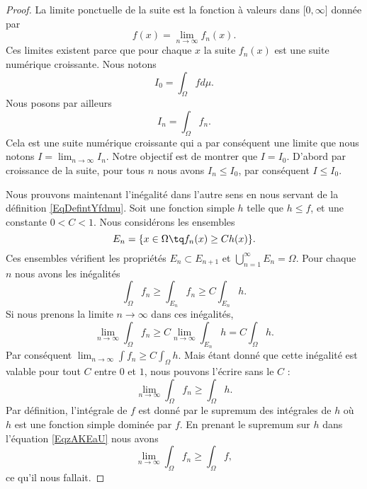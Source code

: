 \begin{proof}
    La limite ponctuelle de la suite est la fonction à valeurs dans \( \mathopen[ 0 , \infty \mathclose]\) donnée par
    \begin{equation}
        f(x)=\lim_{n\to \infty} f_n(x).
    \end{equation}
    Ces limites existent parce que pour chaque \( x\) la suite \( f_n(x)\) est une suite numérique croissante. Nous notons
    \begin{equation}
        I_0=\int_{\Omega}fd\mu.
    \end{equation}
    Nous posons par ailleurs
    \begin{equation}
        I_n=\int_{\Omega}f_n.
    \end{equation}
    Cela est une suite numérique croissante qui a par conséquent une limite que nous notons \( I=\lim_{n\to \infty} I_n\). Notre objectif est de montrer que \( I=I_0\). D'abord par croissance de la suite, pour tous $n$ nous avons \( I_n\leq I_0\), par conséquent \( I\leq I_0\).

    Nous prouvons maintenant l'inégalité dans l'autre sens en nous servant de la définition \eqref{EqDefintYfdmu}. Soit une fonction simple \( h\) telle que \( h\leq f\), et une constante \( 0<C<1\). Nous considérons les ensembles
    \begin{equation}
        E_n=\{ x\in\Omega\tq f_n(x)\geq Ch(x) \}.
    \end{equation}
    Ces ensembles vérifient les propriétés \( E_n\subset E_{n+1}\) et \( \bigcup_{n=1}^{\infty}E_n=\Omega\). Pour chaque \( n\) nous avons les inégalités
    \begin{equation}
        \int_{\Omega}f_n\geq\int_{E_n}f_n\geq C\int_{E_n}h.
    \end{equation}
    Si nous prenons la limite \( n\to\infty\) dans ces inégalités,
    \begin{equation}
        \lim_{n\to \infty} \int_{\Omega}f_n\geq C\lim_{n\to \infty} \int_{E_n}h=C\int_{\Omega}h.
    \end{equation}
    Par conséquent \( \lim_{n\to \infty} \int f_n\geq C\int_{\Omega}h\). Mais étant donné que cette inégalité est valable pour tout \( C\) entre \( 0\) et \( 1\), nous pouvons l'écrire sans le \( C\) :
    \begin{equation}        \label{EqzAKEaU}
        \lim_{n\to \infty} \int_{\Omega}f_n\geq \int_{\Omega}h.
    \end{equation}
    Par définition, l'intégrale de \( f\) est donné par le supremum des intégrales de \( h\) où \( h\) est une fonction simple dominée par \( f\). En prenant le supremum sur \( h\) dans l'équation \eqref{EqzAKEaU} nous avons
    \begin{equation}
        \lim_{n\to \infty} \int_{\Omega}f_n\geq\int_{\Omega}f,
    \end{equation}
    ce qu'il nous fallait.
\end{proof}


